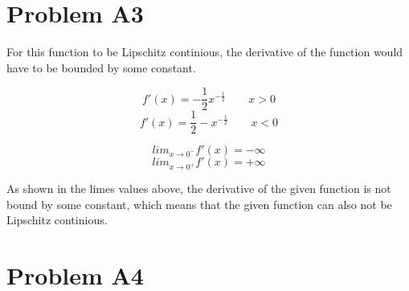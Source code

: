\documentclass[12pt]{article}
\begin{document}
\section*{Problem A3}
For this function to be Lipschitz continious, the derivative of the function would have to be bounded by some constant.

$$f'(x) = -\frac{1}{2} x^{-\frac{1}{2}} \quad \quad x > 0$$
$$f'(x) = \frac{1}{2} -x^{-\frac{1}{2}} \quad \quad x < 0$$

$$lim_{x \rightarrow 0^-} f'(x) = -\infty$$
$$lim_{x \rightarrow 0^+} f'(x) = +\infty$$

As shown in the limes values above, the derivative of the given function is not bound by some constant, which means that the given function can also not be Lipschitz continious.

\newpage
\section*{Problem A4}
\end{document}
